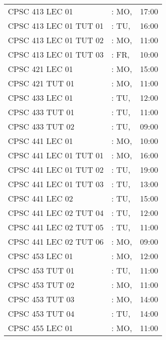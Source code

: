 \documentclass[11pt]{article}
\begin{document}
\begin{longtable}{l l r}
CPSC 413 LEC 01               &\hspace*{1.5cm}:  MO,& 17:00\tabularnewline
CPSC 413 LEC 01 TUT 01        &\hspace*{1.5cm}:  TU,& 16:00\tabularnewline
CPSC 413 LEC 01 TUT 02        &\hspace*{1.5cm}:  MO,& 11:00\tabularnewline
CPSC 413 LEC 01 TUT 03        &\hspace*{1.5cm}:  FR,& 10:00\tabularnewline
CPSC 421 LEC 01               &\hspace*{1.5cm}:  MO,& 15:00\tabularnewline
CPSC 421 TUT 01               &\hspace*{1.5cm}:  MO,& 11:00\tabularnewline
CPSC 433 LEC 01               &\hspace*{1.5cm}:  TU,& 12:00\tabularnewline
CPSC 433 TUT 01               &\hspace*{1.5cm}:  TU,& 11:00\tabularnewline
CPSC 433 TUT 02               &\hspace*{1.5cm}:  TU,& 09:00\tabularnewline
CPSC 441 LEC 01               &\hspace*{1.5cm}:  MO,& 10:00\tabularnewline
CPSC 441 LEC 01 TUT 01        &\hspace*{1.5cm}:  MO,& 16:00\tabularnewline
CPSC 441 LEC 01 TUT 02        &\hspace*{1.5cm}:  TU,& 19:00\tabularnewline
CPSC 441 LEC 01 TUT 03        &\hspace*{1.5cm}:  TU,& 13:00\tabularnewline
CPSC 441 LEC 02               &\hspace*{1.5cm}:  TU,& 15:00\tabularnewline
CPSC 441 LEC 02 TUT 04        &\hspace*{1.5cm}:  TU,& 12:00\tabularnewline
CPSC 441 LEC 02 TUT 05        &\hspace*{1.5cm}:  TU,& 11:00\tabularnewline
CPSC 441 LEC 02 TUT 06        &\hspace*{1.5cm}:  MO,& 09:00\tabularnewline
CPSC 453 LEC 01               &\hspace*{1.5cm}:  MO,& 12:00\tabularnewline
CPSC 453 TUT 01               &\hspace*{1.5cm}:  TU,& 11:00\tabularnewline
CPSC 453 TUT 02               &\hspace*{1.5cm}:  MO,& 11:00\tabularnewline
CPSC 453 TUT 03               &\hspace*{1.5cm}:  MO,& 14:00\tabularnewline
CPSC 453 TUT 04               &\hspace*{1.5cm}:  TU,& 14:00\tabularnewline
CPSC 455 LEC 01               &\hspace*{1.5cm}:  MO,& 11:00\tabularnewline

\end{longtable}
\end{document}
